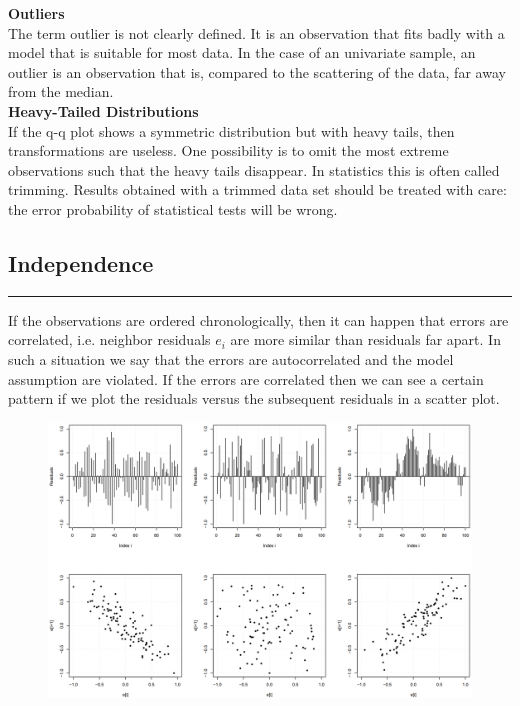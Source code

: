 \textbf{Outliers}\\
The term outlier is not clearly defined. It is an observation that fits badly with a model that is suitable for most data. In the case of an univariate sample, an outlier is an observation that is, compared to the scattering of the data, far away from the median.\\

\textbf{Heavy-Tailed Distributions}\\
If the q-q plot shows a symmetric distribution but with heavy tails, then transformations are useless. One possibility is to omit the most extreme observations such that the heavy tails disappear. In statistics this is often called trimming. Results obtained with a trimmed data set should be treated with care: the error probability of statistical tests will be wrong.

\subsection{Independence}
\noindent\rule[\linienAbstand]{\linewidth}{\linienDicke}
If the observations are ordered chronologically, then it can happen that errors are correlated, i.e. neighbor residuals $e_i$ are more similar than residuals far apart. In such a situation we say that the errors are autocorrelated and the model assumption are violated. If the errors are correlated then we can see a certain pattern if we plot the residuals versus the subsequent residuals in a scatter plot.

\begin{figure}[H]
  \centering
  \includegraphics[width=\linewidth]{Pics/8.4.1.png}
\end{figure}

